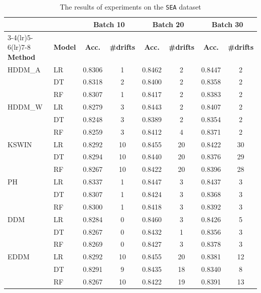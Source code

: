 \begin{table}[h]
    \centering
    \scriptsize
    \caption{The results of experiments on the \texttt{SEA} dataset}
    \label{tab:exp_SEA}
    \begin{tabular}{llcccccc}\toprule
         & & \multicolumn{2}{c}{Batch 10} & \multicolumn{2}{c}{Batch 20} & \multicolumn{2}{c}{Batch 30} \\\cmidrule(lr){3-4}\cmidrule(lr){5-6}\cmidrule(lr){7-8}
         \textbf{Method} & \textbf{Model} & \textbf{Acc.} & \textbf{\#drifts} & \textbf{Acc.} & \textbf{\#drifts} & \textbf{Acc.} & \textbf{\#drifts} \\\midrule
    HDDM\_A  & LR & 0.8306 & 1 & 0.8462 & 2 & 0.8447 & 2 \\
             & DT & 0.8318 & 2 & 0.8400 & 2 & 0.8358 & 2 \\
             & RF & 0.8307 & 1 & 0.8417 & 2 & 0.8383 & 2 \\
    \midrule
    HDDM\_W  & LR & 0.8279 & 3 & 0.8443 & 2 & 0.8407 & 2 \\
             & DT & 0.8248 & 3 & 0.8389 & 2 & 0.8354 & 2 \\
             & RF & 0.8259 & 3 & 0.8412 & 4 & 0.8371 & 2 \\
    \midrule
    KSWIN    & LR & 0.8292 & 10 & 0.8455 & 20 & 0.8422 & 30 \\
             & DT & 0.8294 & 10 & 0.8440 & 20 & 0.8376 & 29 \\
             & RF & 0.8267 & 10 & 0.8422 & 20 & 0.8396 & 28 \\
    \midrule
    PH       & LR & 0.8337 & 1 & 0.8447 & 3 & 0.8437 & 3 \\
             & DT & 0.8307 & 1 & 0.8424 & 3 & 0.8368 & 3 \\
             & RF & 0.8300 & 1 & 0.8418 & 3 & 0.8392 & 3 \\
    \midrule
    DDM      & LR & 0.8284 & 0 & 0.8460 & 3 & 0.8426 & 5 \\
             & DT & 0.8267 & 0 & 0.8432 & 1 & 0.8356 & 3 \\
             & RF & 0.8269 & 0 & 0.8427 & 3 & 0.8378 & 3 \\
    \midrule
    EDDM     & LR & 0.8292 & 10 & 0.8455 & 20 & 0.8381 & 12 \\
             & DT & 0.8291 & 9 & 0.8435 & 18 & 0.8340 & 8 \\
             & RF & 0.8267 & 10 & 0.8422 & 19 & 0.8391 & 13 \\

\end{tabular}
\end{table}
